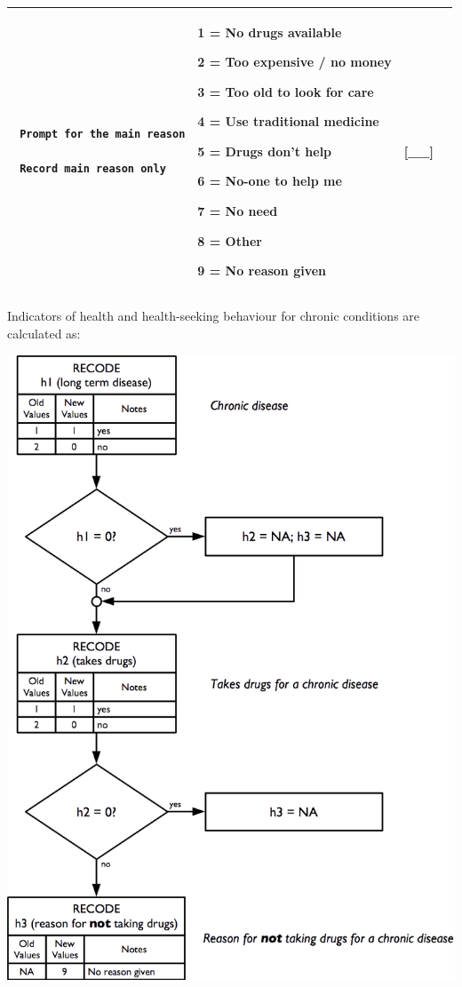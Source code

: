 \documentclass[12pt,a4paper]{book}
\theoremstyle{definition}
\theoremstyle{definition}
\theoremstyle{definition}
\theoremstyle{remark}
\begin{document}
\begin{longtable}[]{@{}llll@{}}
\begin{minipage}[t]{0.24\columnwidth}
\begin{verbatim}
 Prompt for the main reason

 Record main reason only
\end{verbatim}
\strut
\end{minipage} & \begin{minipage}[t]{0.24\columnwidth}\raggedright
1 = No drugs available

2 = Too expensive / no money

3 = Too old to look for care

4 = Use traditional medicine

5 = Drugs don't help

6 = No-one to help me

7 = No need

8 = Other

9 = No reason given\strut
\end{minipage} & \begin{minipage}[t]{0.24\columnwidth}\raggedright
{[}\_\_{]}\strut
\end{minipage}\tabularnewline
\bottomrule
\end{longtable}

Indicators of health and health-seeking behaviour for chronic conditions
are calculated as:

\begin{center}\includegraphics{figures/indicators21} \end{center}
\end{document}
